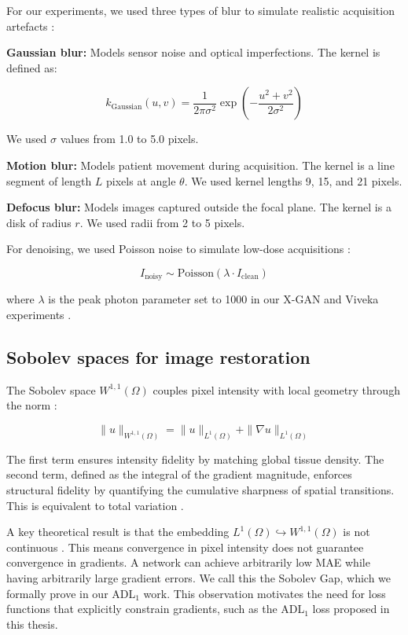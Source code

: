 For our experiments, we used three types of blur to simulate realistic acquisition artefacts \citep{nah2017deep, kupyn2019deblurgan}:

\noindent\textbf{Gaussian blur:} Models sensor noise and optical imperfections. The kernel is defined as:

\[
k_{\text{Gaussian}}(u,v) = \frac{1}{2\pi\sigma^2} \exp\left(-\frac{u^2 + v^2}{2\sigma^2}\right)
\]

We used \(\sigma\) values from 1.0 to 5.0 pixels.

\noindent\textbf{Motion blur:} Models patient movement during acquisition. The kernel is a line segment of length \(L\) pixels at angle \(\theta\). We used kernel lengths 9, 15, and 21 pixels.

\noindent\textbf{Defocus blur:} Models images captured outside the focal plane. The kernel is a disk of radius \(r\). We used radii from 2 to 5 pixels.

For denoising, we used Poisson noise to simulate low-dose acquisitions \citep{siju2026xgan}:

\[
I_{\text{noisy}} \sim \text{Poisson}(\lambda \cdot I_{\text{clean}})
\]

where \(\lambda\) is the peak photon parameter set to 1000 in our X-GAN and Viveka experiments \citep{siju2026xgan}.

\subsection{Sobolev spaces for image restoration}

The Sobolev space \(W^{1,1}(\Omega)\) couples pixel intensity with local geometry through the norm \citep{adams2003sobolev, evans2010partial}:

\[
\|u\|_{W^{1,1}(\Omega)} = \|u\|_{L^1(\Omega)} + \|\nabla u\|_{L^1(\Omega)}
\]

The first term ensures intensity fidelity by matching global tissue density. The second term, defined as the integral of the gradient magnitude, enforces structural fidelity by quantifying the cumulative sharpness of spatial transitions. This is equivalent to total variation \citep{rudin1992nonlinear}.

A key theoretical result is that the embedding \(L^1(\Omega) \hookrightarrow W^{1,1}(\Omega)\) is not continuous \citep{adams2003sobolev}. This means convergence in pixel intensity does not guarantee convergence in gradients. A network can achieve arbitrarily low MAE while having arbitrarily large gradient errors. We call this the Sobolev Gap, which we formally prove in our ADL\(_1\) work. This observation motivates the need for loss functions that explicitly constrain gradients, such as the ADL\(_1\) loss proposed in this thesis.
